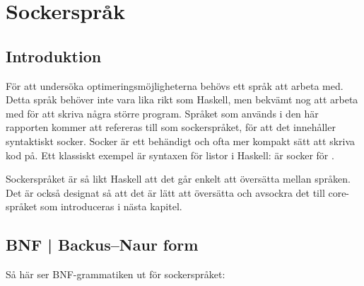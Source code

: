 \documentclass[Rapport]{subfiles}
\begin{document}
\section{Sockerspråk}

%
%
%
%
%
%
%

%


\subsection{Introduktion}

För att undersöka optimeringsmöjligheterna behövs ett språk att arbeta med. 
Detta språk behöver inte vara lika rikt som Haskell, men bekvämt nog
att arbeta med för att skriva några större program. Språket som används i den
här rapporten kommer att refereras till som sockerspråket, för att det 
innehåller syntaktiskt socker. Socker är ett behändigt och ofta mer kompakt sätt 
att skriva kod på. Ett klassiskt exempel är syntaxen
för listor i Haskell: \miniCode{[5,0,4]} är socker för .

Sockerspråket är så likt Haskell att det går enkelt att översätta mellan språken.
Det är också designat så att det är lätt att översätta och avsockra det till 
core-språket som introduceras i nästa kapitel. 

\subsection{BNF | Backus–Naur form}

Så här ser BNF-grammatiken ut för sockerspråket:
\end{document}
